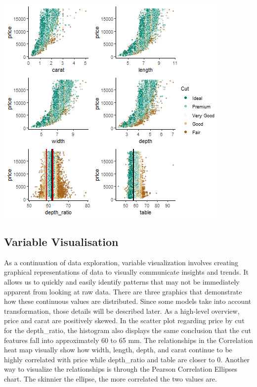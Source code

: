 \documentclass[
  paper=a4,
  ,captions=tableheading
]{scrartcl}
\begin{document}
\begin{center}\includegraphics{Diamonds_PDF_files/figure-latex/Price by X and Cut-1} \end{center}

\hypertarget{variable-visualisation}{%
\subsection{Variable Visualisation}\label{variable-visualisation}}

As a continuation of data exploration, variable visualization involves
creating graphical representations of data to visually communicate
insights and trends. It allows us to quickly and easily identify
patterns that may not be immediately apparent from looking at raw data.
There are three graphics that demonstrate how these continuous values
are distributed. Since some models take into account transformation,
those details will be described later. As a high-level overview, price
and carat are positively skewed. In the scatter plot regarding price by
cut for the depth\_ratio, the histogram also displays the same
conclusion that the cut features fall into approximately 60 to 65 mm.
The relationships in the Correlation heat map visually show how width,
length, depth, and carat continue to be highly correlated with price
while depth\_ratio and table are closer to 0. Another way to visualize
the relationships is through the Pearson Correlation Ellipses chart. The
skinnier the ellipse, the more correlated the two values are.
\end{document}
